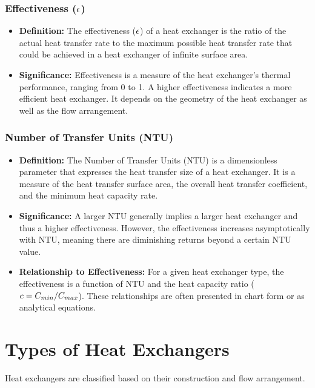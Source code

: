\subsubsection*{Effectiveness ($\epsilon$)}
\begin{itemize}
    \item \textbf{Definition:} The effectiveness ($\epsilon$) of a heat exchanger is the ratio of the actual heat transfer rate to the maximum possible heat transfer rate that could be achieved in a heat exchanger of infinite surface area.
    \item \textbf{Significance:} Effectiveness is a measure of the heat exchanger's thermal performance, ranging from 0 to 1. A higher effectiveness indicates a more efficient heat exchanger. It depends on the geometry of the heat exchanger as well as the flow arrangement.
\end{itemize}
\subsubsection*{Number of Transfer Units (NTU)}
\begin{itemize}
    \item \textbf{Definition:} The Number of Transfer Units (NTU) is a dimensionless parameter that expresses the heat transfer size of a heat exchanger. It is a measure of the heat transfer surface area, the overall heat transfer coefficient, and the minimum heat capacity rate.
    \item \textbf{Significance:} A larger NTU generally implies a larger heat exchanger and thus a higher effectiveness. However, the effectiveness increases asymptotically with NTU, meaning there are diminishing returns beyond a certain NTU value.
    \item \textbf{Relationship to Effectiveness:} For a given heat exchanger type, the effectiveness is a function of NTU and the heat capacity ratio ($c = C_{min} / C_{max}$). These relationships are often presented in chart form or as analytical equations.
\end{itemize}

\section{Types of Heat Exchangers}
Heat exchangers are classified based on their construction and flow arrangement.

